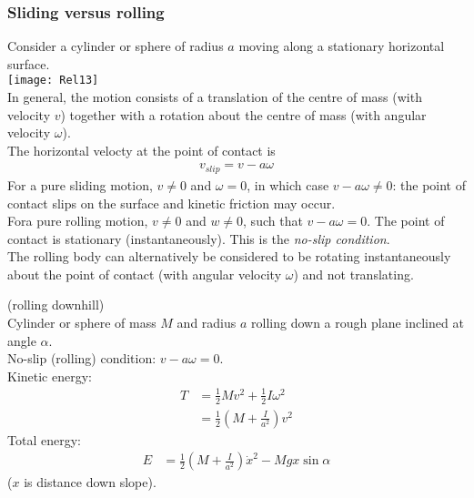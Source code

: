 \documentclass[a4paper]{article}
\begin{document}
\subsubsection{Sliding versus rolling}
Consider a cylinder or sphere of radius $a$ moving along a stationary horizontal surface.\\
\texttt{[image: Rel13]}\\
In general, the motion consists of a translation of the centre of mass (with velocity $v$) together with a rotation about the centre of mass (with angular velocity $\omega$).\\
The horizontal velocty at the point of contact is 
\begin{equation*}
\begin{aligned}
v_{slip} = v-a\omega
\end{aligned}
\end{equation*}
For a pure sliding motion, $v\neq 0$ and $\omega =0$, in which case $v-a\omega \neq 0$: the point of contact slips on the surface and kinetic friction may occur.\\
Fora pure rolling motion, $v\neq 0$ and $w\neq 0$, such that $v-a\omega =0$. The point of contact is stationary (instantaneously). This is the \emph{no-slip condition}.\\
The rolling body can alternatively be considered to be rotating instantaneously about the point of contact (with angular velocity $\omega$) and not translating.

\begin{eg} (rolling downhill)\\
Cylinder or sphere of mass $M$ and radius $a$ rolling down a rough plane inclined at angle $\alpha$.\\
No-slip (rolling) condition: $v-a\omega = 0$.\\
Kinetic energy:
\begin{equation*}
\begin{aligned}
T&=\frac{1}{2}Mv^2+\frac{1}{2}I\omega^2\\
&=\frac{1}{2}\left(M+\frac{I}{a^2}\right)v^2
\end{aligned}
\end{equation*}
Total energy:
\begin{equation*}
\begin{aligned}
E&=\frac{1}{2}\left(M+\frac{I}{a^2}\right)\dot{x}^2-Mgx\sin\alpha
\end{aligned}
\end{equation*}
($x$ is distance down slope).
\end{eg}
\end{document}
